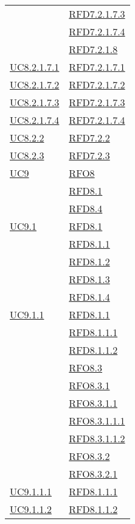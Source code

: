\begin{longtable}{|>{\centering}m{5cm}|m{5cm}<{\centering}|}
& \hyperlink{RFD7.2.1.7.3}{RFD7.2.1.7.3}\\
& \hyperlink{RFD7.2.1.7.4}{RFD7.2.1.7.4}\\
& \hyperlink{RFD7.2.1.8}{RFD7.2.1.8}\\ \hline
\hyperref[UC8.2.1.7.1]{UC8.2.1.7.1} & \hyperlink{RFD7.2.1.7.1}{RFD7.2.1.7.1}\\ \hline
\hyperref[UC8.2.1.7.2]{UC8.2.1.7.2} & \hyperlink{RFD7.2.1.7.2}{RFD7.2.1.7.2}\\ \hline
\hyperref[UC8.2.1.7.3]{UC8.2.1.7.3} & \hyperlink{RFD7.2.1.7.3}{RFD7.2.1.7.3}\\ \hline
\hyperref[UC8.2.1.7.4]{UC8.2.1.7.4} & \hyperlink{RFD7.2.1.7.4}{RFD7.2.1.7.4}\\ \hline
\hyperref[UC8.2.2]{UC8.2.2} & \hyperlink{RFD7.2.2}{RFD7.2.2}\\ \hline
\hyperref[UC8.2.3]{UC8.2.3} & \hyperlink{RFD7.2.3}{RFD7.2.3}\\ \hline
\hyperref[UC9]{UC9} & \hyperlink{RFO8}{RFO8}\\
& \hyperlink{RFD8.1}{RFD8.1}\\
& \hyperlink{RFD8.4}{RFD8.4}\\ \hline
\hyperref[UC9.1]{UC9.1} & \hyperlink{RFD8.1}{RFD8.1}\\
& \hyperlink{RFD8.1.1}{RFD8.1.1}\\
& \hyperlink{RFD8.1.2}{RFD8.1.2}\\
& \hyperlink{RFD8.1.3}{RFD8.1.3}\\
& \hyperlink{RFD8.1.4}{RFD8.1.4}\\ \hline
\hyperref[UC9.1.1]{UC9.1.1} & \hyperlink{RFD8.1.1}{RFD8.1.1}\\
& \hyperlink{RFD8.1.1.1}{RFD8.1.1.1}\\
& \hyperlink{RFD8.1.1.2}{RFD8.1.1.2}\\
& \hyperlink{RFO8.3}{RFO8.3}\\
& \hyperlink{RFO8.3.1}{RFO8.3.1}\\
& \hyperlink{RFO8.3.1.1}{RFO8.3.1.1}\\
& \hyperlink{RFO8.3.1.1.1}{RFO8.3.1.1.1}\\
& \hyperlink{RFD8.3.1.1.2}{RFD8.3.1.1.2}\\
& \hyperlink{RFO8.3.2}{RFO8.3.2}\\
& \hyperlink{RFO8.3.2.1}{RFO8.3.2.1}\\ \hline
\hyperref[UC9.1.1.1]{UC9.1.1.1} & \hyperlink{RFD8.1.1.1}{RFD8.1.1.1}\\ \hline
\hyperref[UC9.1.1.2]{UC9.1.1.2} & \hyperlink{RFD8.1.1.2}{RFD8.1.1.2}\\ \hline

\end{longtable}
